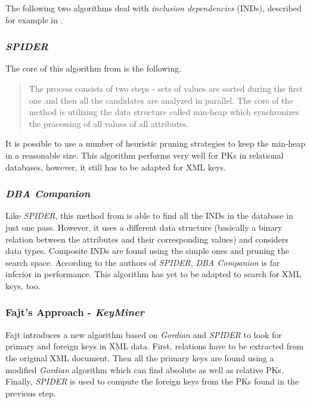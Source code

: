 The following two algorithms deal with \textit{inclusion dependencies} (INDs), described for example in \cite{fajt-12}.

\subsubsection{\textit{SPIDER}}

The core of this algorithm from \cite{fajt-51, fajt-53} is the following.

\begin{quote}
The process consists of two steps - sets of values are sorted during the first one and then all the candidates are analyzed in parallel. The core of the method is utilizing the data structure called min-heap which synchronizes the processing of all values of all attributes.
\end{quote}

It is possible to use a number of heuristic pruning strategies to keep the min-heap in a reasonable size. This algorithm performs very well for PKs in relational databases, however, it still has to be adapted for XML keys.

\subsubsection{\textit{DBA Companion}}

Like \textit{SPIDER}, this method from \cite{fajt-53} is able to find all the INDs in the database in just one pass. However, it uses a different data structure (basically a binary relation between the attributes and their corresponding values) and considers data types. Composite INDs are found using the simple ones and pruning the search space. According to the authors of \textit{SPIDER}, \textit{DBA Companion} is far inferior in performance. This algorithm has yet to be adapted to search for XML keys, too.

\subsubsection{Fajt's Approach - \textit{KeyMiner}}

Fajt introduces a new algorithm based on \textit{Gordian} and \textit{SPIDER} to look for primary and foreign keys in XML data. First, relations have to be extracted from the original XML document. Then all the primary keys are found using a modified \textit{Gordian} algorithm which can find absolute as well as relative PKs. Finally, \textit{SPIDER} is used to compute the foreign keys from the PKs found in the previous step.

